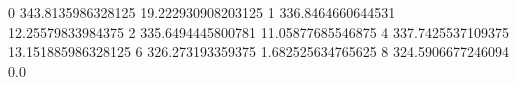0 343.8135986328125 19.222930908203125
1 336.8464660644531 12.25579833984375
2 335.6494445800781 11.05877685546875
4 337.7425537109375 13.151885986328125
6 326.273193359375 1.682525634765625
8 324.5906677246094 0.0

